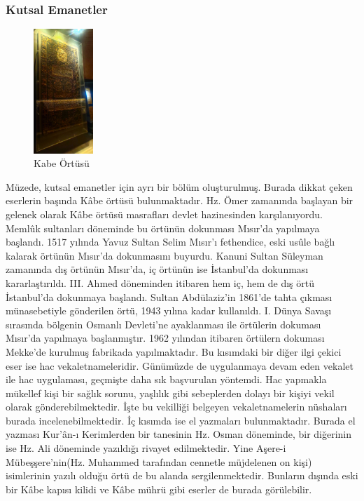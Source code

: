 \subsubsection{Kutsal Emanetler}
\begin{figure}
    \centering
    \includegraphics[width=0.20\textwidth]{assets/kabe.jpg}
    \caption{Kabe Örtüsü}
    \label{fig:kabe}
\end{figure}
\indent\indent Müzede, kutsal emanetler için ayrı bir bölüm oluşturulmuş. Burada dikkat çeken eserlerin başında Kâbe örtüsü bulunmaktadır. Hz. Ömer zamanında başlayan bir gelenek olarak Kâbe örtüsü masrafları devlet hazinesinden karşılanıyordu. Memlûk sultanları döneminde bu örtünün dokunması Mısır'da yapılmaya başlandı. 1517 yılında Yavuz Sultan Selim Mısır'ı fethendice, eski usûle bağlı kalarak örtünün Mısır'da dokunmasını buyurdu. Kanuni Sultan Süleyman zamanında dış örtünün Mısır'da, iç örtünün ise İstanbul'da dokunması kararlaştırıldı. III. Ahmed döneminden itibaren hem iç, hem de dış örtü İstanbul'da dokunmaya başlandı. Sultan Abdülaziz'in 1861'de tahta çıkması münasebetiyle gönderilen örtü, 1943 yılına kadar kullanıldı. I. Dünya Savaşı sırasında bölgenin Osmanlı Devleti'ne ayaklanması ile örtülerin dokuması Mısır'da yapılmaya başlanmıştır. 1962 yılından itibaren örtülern dokuması Mekke'de kurulmuş fabrikada yapılmaktadır.\cite{dia_4}\newline
\indent Bu kısımdaki bir diğer ilgi çekici eser ise hac vekaletnameleridir. Günümüzde de uygulanmaya devam eden vekalet ile hac uygulaması, geçmişte daha sık başvurulan yöntemdi. Hac yapmakla mükellef kişi bir sağlık sorunu, yaşlılık gibi sebeplerden dolayı bir kişiyi vekil olarak gönderebilmektedir. İşte bu vekilliği belgeyen vekaletnamelerin nüshaları burada incelenebilmektedir.\newline
\indent İç kısımda ise el yazmaları bulunmaktadır. Burada el yazması Kur'ân-ı Kerimlerden bir tanesinin Hz. Osman döneminde, bir diğerinin ise Hz. Ali döneminde yazıldığı rivayet edilmektedir. Yine Aşere-i Mübeşşere'nin(Hz. Muhammed tarafından cennetle müjdelenen on kişi) isimlerinin yazılı olduğu örtü de bu alanda sergilenmektedir. Bunların dışında eski bir Kâbe kapısı kilidi ve Kâbe mührü gibi eserler de burada görülebilir.
